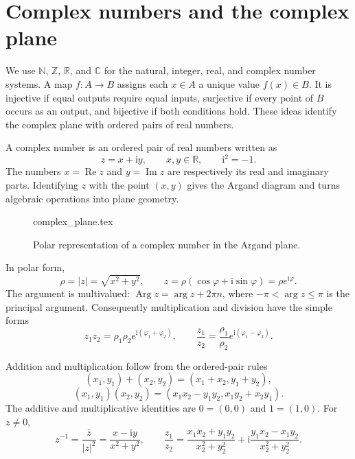\section{Complex numbers and the complex plane}

We use $\mathbb{N}$, $\mathbb{Z}$, $\mathbb{R}$, and $\mathbb{C}$ for the natural, integer, real, and complex number systems. A map $f:A\to B$ assigns each $x\in A$ a unique value $f(x)\in B$. It is injective if equal outputs require equal inputs, surjective if every point of $B$ occurs as an output, and bijective if both conditions hold. These ideas identify the complex plane with ordered pairs of real numbers.

A complex number is an ordered pair of real numbers written as
\begin{equation}
z=x+\mathrm{i}y,\qquad x,y\in\mathbb{R},\qquad \mathrm{i}^2=-1.
\end{equation}
The numbers $x=\operatorname{Re}z$ and $y=\operatorname{Im}z$ are respectively its real and imaginary parts. Identifying $z$ with the point $(x,y)$ gives the Argand diagram and turns algebraic operations into plane geometry.

\begin{figure}[htb]
    \centering
    {complex_plane.tex}
    \caption{Polar representation of a complex number in the Argand plane.}
    \label{fig:ch06-complex-plane}
\end{figure}

In polar form,
\begin{equation}
\rho=|z|=\sqrt{x^2+y^2},\qquad
z=\rho(\cos\varphi+\mathrm{i}\sin\varphi)=\rho e^{\mathrm{i}\varphi}.
\end{equation}
The argument is multivalued: $\operatorname{Arg}z=\arg z+2\pi n$, where $-\pi<\arg z\leq\pi$ is the principal argument. Consequently multiplication and division have the simple forms
\begin{equation}
z_1z_2=\rho_1\rho_2e^{\mathrm{i}(\varphi_1+\varphi_2)},
\qquad
\frac{z_1}{z_2}=\frac{\rho_1}{\rho_2}e^{\mathrm{i}(\varphi_1-\varphi_2)}.
\end{equation}

Addition and multiplication follow from the ordered-pair rules
\begin{equation}
(x_1,y_1)+(x_2,y_2)=(x_1+x_2,y_1+y_2),
\end{equation}
\begin{equation}
(x_1,y_1)(x_2,y_2)=(x_1x_2-y_1y_2,x_1y_2+x_2y_1).
\end{equation}
The additive and multiplicative identities are $0=(0,0)$ and $1=(1,0)$. For $z\ne0$,
\begin{equation}
z^{-1}=\frac{\bar z}{|z|^2}=\frac{x-\mathrm{i}y}{x^2+y^2},
\qquad
\frac{z_1}{z_2}=\frac{x_1x_2+y_1y_2}{x_2^2+y_2^2}
+\mathrm{i}\frac{y_1x_2-x_1y_2}{x_2^2+y_2^2}.
\end{equation}

